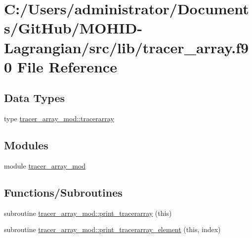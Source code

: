 \hypertarget{tracer__array_8f90}{}\section{C\+:/\+Users/administrator/\+Documents/\+Git\+Hub/\+M\+O\+H\+I\+D-\/\+Lagrangian/src/lib/tracer\+\_\+array.f90 File Reference}
\label{tracer__array_8f90}
\subsection*{Data Types}
\begin{DoxyCompactItemize}
\item 
type \mbox{\hyperlink{structtracer__array__mod_1_1tracerarray}{tracer\+\_\+array\+\_\+mod\+::tracerarray}}
\end{DoxyCompactItemize}
\subsection*{Modules}
\begin{DoxyCompactItemize}
\item 
module \mbox{\hyperlink{namespacetracer__array__mod}{tracer\+\_\+array\+\_\+mod}}
\end{DoxyCompactItemize}
\subsection*{Functions/\+Subroutines}
\begin{DoxyCompactItemize}
\item 
subroutine \mbox{\hyperlink{namespacetracer__array__mod_a173acbcf343367bf87b705fe5ca0dd29}{tracer\+\_\+array\+\_\+mod\+::print\+\_\+tracerarray}} (this)
\item 
subroutine \mbox{\hyperlink{namespacetracer__array__mod_ac3b3896987e589190c759e92e95e05af}{tracer\+\_\+array\+\_\+mod\+::print\+\_\+tracerarray\+\_\+element}} (this, index)
\end{DoxyCompactItemize}
